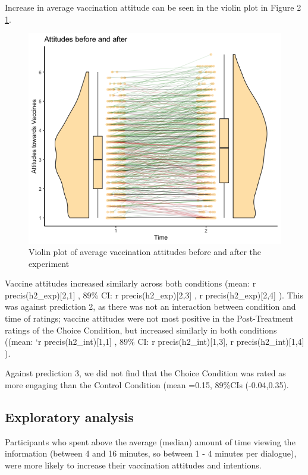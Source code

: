 \documentclass[
  english,
  ,jou,floatsintext]{apa6}
\begin{document}
Increase in average vaccination attitude can be seen in the violin plot in Figure 2 \ref{fig:figure2}.

\begin{figure}

{\centering \includegraphics[width=0.75\linewidth]{../plots/before_and_after_violin} 

}

\caption{Violin plot of average vaccination attitudes before and after the experiment}\label{fig:figure2}
\end{figure}

Vaccine attitudes increased similarly across both conditions (mean: r precis(h2\_exp){[}2,1{]} , 89\% CI: r precis(h2\_exp){[}2,3{]} , r precis(h2\_exp){[}2,4{]} ). This was against prediction 2, as there was not an interaction between condition and time of ratings; vaccine attitudes were not most positive in the Post-Treatment ratings of the Choice Condition, but increased similarly in both conditions ((mean: `r precis(h2\_int){[}1,1{]} , 89\% CI: r precis(h2\_int){[}1,3{]}, r precis(h2\_int){[}1,4{]} ).

Against prediction 3, we did not find that the Choice Condition was rated as more engaging than the Control Condition (mean =0.15, 89\%CIs (-0.04,0.35).

\hypertarget{exploratory-analysis}{%
\subsection{Exploratory analysis}\label{exploratory-analysis}}

Participants who spent above the average (median) amount of time viewing the information (between 4 and 16 minutes, so between 1 - 4 minutes per dialogue), were more likely to increase their vaccination attitudes and intentions.
\end{document}
